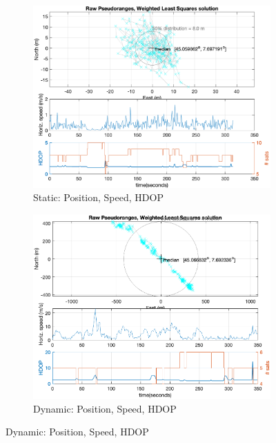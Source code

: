         \begin{figure}[h!]
            \centering
            \begin{subfigure}{0.23\textwidth}
                \includegraphics[width=\textwidth]{images/tests/Monte_Cappuccini/png/Samsung_A51_Monte_Cappuccini_fig4.png}
                \caption{Static: Position, Speed, HDOP}
                \label{fig:Position_Speed_a}
            \end{subfigure}
            \hfill
            \begin{subfigure}{0.23\textwidth}
                \includegraphics[width=\textwidth]{images/tests/Tram_15_trip_Castello_to_Pescatore/filtered/Samsung_A51_Tram_15_trip_Castello_to_Pescatore_fig4.png}
                \caption{Dynamic: Position, Speed, HDOP}
                \label{fig:Position_Speed_b}
            \end{subfigure}
        \end{figure}
    
